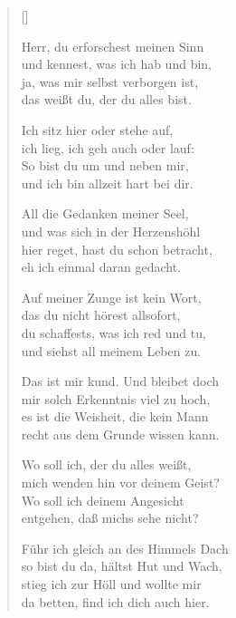 \begin{multicols}{2}
\settowidth{\versewidth}{Das ist mir kund. Und bleibet doch}
\begin{verse}[\versewidth]


 Herr, du erforschest meinen Sinn\\
und kennest, was ich hab und bin,\\
ja, was mir selbst verborgen ist,\\
das weißt du, der du alles bist.

 Ich sitz hier oder stehe auf,\\
ich lieg, ich geh auch oder lauf:\\
So bist du um und neben mir,\\
und ich bin allzeit hart bei dir.

 All die Gedanken meiner Seel,\\
und was sich in der Herzenshöhl\\
hier reget, hast du schon betracht,\\
eh ich einmal daran gedacht.

 Auf meiner Zunge ist kein Wort,\\
das du nicht hörest allsofort,\\
du schaffests, was ich red und tu,\\
und siehst all meinem Leben zu.

 Das ist mir kund. Und bleibet doch\\
mir solch Erkenntnis viel zu hoch,\\
es ist die Weisheit, die kein Mann\\
recht aus dem Grunde wissen kann.

 Wo soll ich, der du alles weißt,\\
mich wenden hin vor deinem Geist?\\
Wo soll ich deinem Angesicht\\
entgehen, daß michs sehe nicht?

 Führ ich gleich an des Himmels Dach\\
so bist du da, hältst Hut und Wach,\\
stieg ich zur Höll und wollte mir\\
da betten, find ich dich auch hier.


\end{verse}
\end{multicols}
